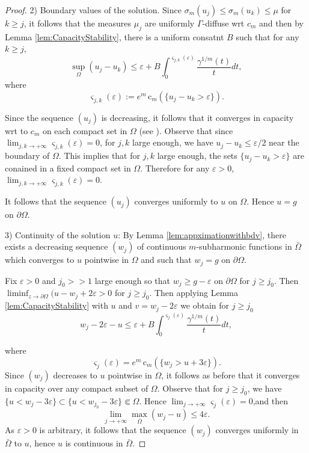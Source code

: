 \documentclass[12pt]{amsart}
\theoremstyle{definition}
\numberwithin{theorem}{section}
\numberwithin{equation}{section}
\newcommand{\e}{\varepsilon}
\begin{document}
{\begin{proof}
2) Boundary values of the solution. Since $\sigma_m (u_j) \leq \sigma_m (u_k) \leq \mu$ for $k \geq j$, it follows that the measures $\mu_j$ are uniformly $\Gamma$-diffuse wrt $c_m$ and then by  Lemma \ref{lem:CapacityStability}, there is a uniform consatnt $B$ such that for any $k \geq j$, 
$$
\sup_{\Omega}(u_j-u_k) \leq\varepsilon+ B \int_0^{ \varsigma_{j,k} (\varepsilon)} \frac{\gamma^{1 \slash m}  (t)}{t} d t,
$$
where
$$
\varsigma_{j,k} (\varepsilon) := e^m  \, \mathrm{c} _{m} (\{u_j - u_k>\varepsilon\}).
$$

Since the sequence $(u_j)$ is decreasing, it follows that it converges in capacity wrt to $c_m$ on each compact set in $\Omega$ (see \cite{Lu12}). 
Observe that since $\lim_{j,k \to + \infty} \varsigma_{j,k} (\varepsilon) = 0$, for $j, k$ large enough, we have $u_j - u_k \leq \varepsilon \slash 2$ near the boundary of $\Omega$. This implies that for $j, k$ large enough, the sets $\{u_j - u_k>\varepsilon\}$ are conained in a fixed compact set in $\Omega$. Therefore  for any $\varepsilon> 0$, $\lim_{j,k \to + \infty} \varsigma_{j,k} (\varepsilon) = 0$.

It follows that  the sequence $(u_j)$ converges uniformly to $u$ on $\Omega$. Hence $u = g$ on $\partial \Omega$.


3) Continuity of the solution $u$: By Lemma \ref{lem:appximationwithbdv}, there exists  a decreasing sequence  $(w_j)$ of continuous $m$-subharmonic functions in $\bar{\Omega}$ which converges to $u$ pointwise in $\Omega$ and such that $w_j = g$ on $\partial \Omega$. 

Fix $\e > 0$ and $j_0 >> 1$ large enough so that $w_j \geq g -\e$ on $\partial \Omega$ for $j \geq j_0$.
Then $\liminf_{z \to \partial \Omega} (u - w_j + 2 \e > 0$ for $j \geq j_0$.
Then applying Lemma \ref{lem:CapacityStability} with $u $ and $v = w_j - 2 \e$ we obtain  for $j \geq j_0$
$$
 w_j - 2 \e - u \leq \e + B \int_0^{\varsigma _j (\e)} \frac{\gamma^{1 \slash m} (t)}{t} d t,
$$

where
$$
\varsigma _j (\e) = e^m \, \mathrm{c}_m (\{ w_j > u + 3 \e\}).
$$
Since $(w_j)$ decreases to $u$ pointwise in $\Omega$, it follows as before that it converges in capacity over any compact subset of $\Omega$. Observe that for $j \geq j_0$, we have $\{u < w_j - 3 \e\} \subset \{u < w_{j_0} - 3 \e\} \Subset \Omega$. Hence $\lim_{j \to + \infty} \varsigma_j (\e) = 0$,and then
$$
\lim_{j \to + \infty} \max_{\bar \Omega}(w_j - u) \leq 4 \e.
$$
As $\e > 0$ is arbitrary, it follows that the sequence $(w_j)$ converges uniformly in $\bar{\Omega}$ to $u$, hence $u$ is continuous in $\bar \Omega$. 
\end{proof}

}
\end{document}
